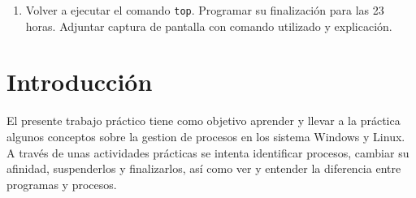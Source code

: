 \documentclass[12pt]{article}
\begin{document}
\begin{enumerate}[1.]
    \item Volver a ejecutar el comando \verb|top|. Programar su finalización para las 23 horas. Adjuntar captura de pantalla con comando utilizado y explicación.
  \end{enumerate}

  \section{Introducción}
  El presente trabajo práctico tiene como objetivo aprender y llevar a la práctica algunos conceptos sobre la gestion de procesos en los sistema Windows y Linux. A través de unas actividades prácticas se intenta identificar procesos, cambiar su afinidad, suspenderlos y finalizarlos, así como ver y entender la diferencia entre programas y procesos.
\end{document}
